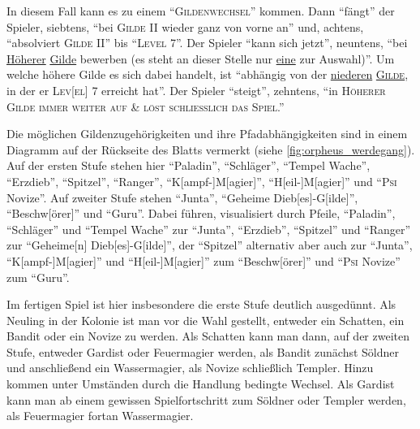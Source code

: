 \documentclass[a5paper,pagesize,numbers=noenddot]{scrbook}
\begin{document}
In diesem Fall kann es zu einem \enquote{\textsc{Gildenwechsel}} kommen.
Dann \enquote{fängt} der Spieler, siebtens, \enquote{bei \textsc{Gilde} II wieder ganz von vorne an} und, achtens, \enquote{absolviert \textsc{Gilde} II} bis \enquote{\textsc{Level} 7}.
Der Spieler \enquote{kann sich jetzt}, neuntens, \enquote{bei \uline{Höherer} \uline{Gilde} bewerben (es steht an dieser Stelle nur \uline{eine} zur Auswahl)}.
Um welche höhere Gilde es sich dabei handelt, ist \enquote{abhängig von der \uline{niederen} \textsc{\uline{Gilde}}, in der er \textsc{Lev[el]} 7 erreicht hat}.
Der Spieler \enquote{steigt}, zehntens, \enquote{in \textsc{Höherer Gilde immer weiter auf \& löst schliesslich das Spiel}.}

Die möglichen Gildenzugehörigkeiten und ihre Pfadabhängigkeiten sind in einem Diagramm auf der Rückseite des Blatts vermerkt (siehe \autoref{fig:orpheus_werdegang}). %
Auf der ersten Stufe stehen hier \enquote{Paladin}, \enquote{Schläger}, \enquote{Tempel Wache}, \enquote{Erzdieb}, \enquote{Spitzel}, \enquote{Ranger}, \enquote{K[ampf-]M[agier]}, \enquote{H[eil-]M[agier]} und \enquote{\textsc{Psi} Novize}.
Auf zweiter Stufe stehen \enquote{Junta}, \enquote{Geheime Dieb[es]-G[ilde]}, \enquote{Beschw[örer]} und \enquote{Guru}.
Dabei führen, visualisiert durch Pfeile, \enquote{Paladin}, \enquote{Schläger} und \enquote{Tempel Wache} zur \enquote{Junta}, \enquote{Erzdieb}, \enquote{Spitzel} und \enquote{Ranger} zur \enquote{Geheime[n] Dieb[es]-G[ilde]}, der \enquote{Spitzel} alternativ aber auch zur \enquote{Junta}, \enquote{K[ampf-]M[agier]} und \enquote{H[eil-]M[agier]} zum \enquote{Beschw[örer]} und \enquote{\textsc{Psi} Novize} zum \enquote{Guru}.

Im fertigen Spiel ist hier insbesondere die erste Stufe deutlich ausgedünnt.
Als Neuling in der Kolonie ist man vor die Wahl gestellt, entweder ein Schatten, ein Bandit oder ein Novize zu werden.
Als Schatten kann man dann, auf der zweiten Stufe, entweder Gardist oder Feuermagier werden, als Bandit zunächst Söldner und anschließend ein Wassermagier, als Novize schließlich Templer.
Hinzu kommen unter Umständen durch die Handlung bedingte Wechsel.
Als Gardist kann man ab einem gewissen Spielfortschritt zum Söldner oder Templer werden, als Feuermagier fortan Wassermagier.
\end{document}
